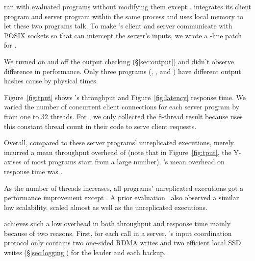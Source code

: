 
\xxx ran with \nprog evaluated programs without modifying them except
\calvin. \calvin integrates its client program and server program within the
same process and uses local memory to let these two programs talk. To
make \calvin's client and server communicate with POSIX sockets so that \xxx
can intercept the server's inputs, we wrote a \nlinescalvin-line patch for
\calvin.

We turned on and off the output checking (\S\ref{sec:output}) and didn't 
observe difference in \xxx performance. Only three programs (\mediatomb, 
\mysql, and \openldap) have different output hashes cause by physical times.

Figure~\ref{fig:tput} shows \xxx's throughput and Figure~\ref{fig:latency}
response time. We varied the number of concurrent client connections for each
server program by from one to 32 threads. For \calvin, we only collected the
8-thread result because \calvin uses this constant thread count in their code
to serve client requests.

Overall, compared to these server programs' unreplicated executions, \xxx 
merely incurred a mean throughput overhead of \tputoverhead (note that in 
Figure~\ref{fig:tput}, the Y-axises of most programs start from a large 
number). \xxx's mean overhead on response time was \latencyoverhead.

As the number of threads increases, all programs' unreplicated executions
got a performance improvement except \memcached. A prior
evaluation~\cite{rex:eurosys14} also observed a similar \memcached low
scalability. \xxx scaled almost as well as the unreplicated executions.

\xxx achieves such a low overhead in both throughput and response time mainly
because of two reasons. First, for each \recv call in a server, \xxx's input
coordination protocol only contains two one-sided RDMA writes and two efficient 
local SSD writes (\S\ref{sec:logging}) for the leader and each backup.


